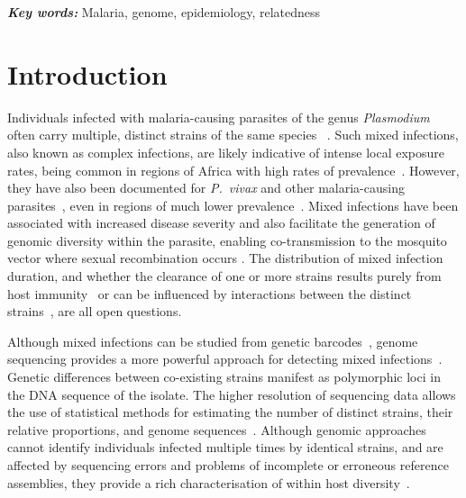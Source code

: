\documentclass[9pt,lineno]{elife}
\providecommand{\keywords}[1]{\textbf{\textit{Key words:}} #1}
\begin{document}
\keywords{Malaria, genome, epidemiology, relatedness}


\section{Introduction}

Individuals infected with malaria-causing parasites of the genus {\it Plasmodium} often carry multiple, distinct strains of the same species ~\citep{Bell2006}.  Such mixed infections, also known as complex infections, are likely indicative of intense local exposure rates, being common in regions of Africa with high rates of prevalence~\citep{Howes2016}. However, they have also been documented for {\it P.~vivax} and other malaria-causing parasites~\citep{Mueller2007, Collins2012}, even in regions of much lower prevalence~\citep{Howes2016, Steenkeste2010}.  Mixed infections have been associated with increased disease severity \citep{deRoode2005} and also facilitate the generation of genomic diversity within the parasite, enabling co-transmission to the mosquito vector where sexual recombination occurs \citep{Mzilahowa2007}.  The distribution of mixed infection duration, and whether the clearance of one or more strains results purely from host immunity~\citep{Borrmann2011} or can be influenced by interactions between the distinct strains~\citep{Enosse2006, Bushman2016}, are all open questions.

Although mixed infections can be studied from genetic barcodes~\citep{Galinsky2015}, genome sequencing provides a more powerful approach for detecting mixed infections~\citep{Jack2016, Chang2017}.  Genetic differences between co-existing strains manifest as polymorphic loci in the DNA sequence of the isolate. The higher resolution of sequencing data allows the use of statistical methods for estimating the number of distinct strains, their relative proportions, and genome sequences~\citep{Zhu2017}.  Although genomic approaches cannot identify individuals infected multiple times by identical strains, and are affected by sequencing errors and problems of incomplete or erroneous reference assemblies, they provide a rich characterisation of within host diversity~\citep{Manske2012, auburn2012characterization, Pearson2016}.
\end{document}
